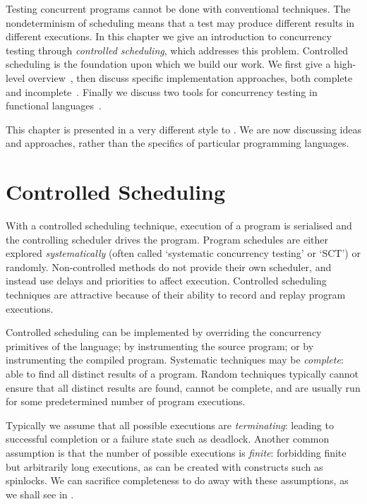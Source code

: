 Testing concurrent programs cannot be done with conventional
techniques.  The nondeterminism of scheduling means that a test may
produce different results in different executions.  In this chapter we
give an introduction to concurrency testing through \emph{controlled
  scheduling}, which addresses this problem.  Controlled scheduling is
the foundation upon which we build our work.  We first give a
high-level overview~, then discuss specific
implementation approaches, both complete~ and
incomplete~.  Finally we discuss two tools for
concurrency testing in functional languages~.

This chapter is presented in a very different style to
.  We are now discussing ideas and
approaches, rather than the specifics of particular programming
languages.

\section{Controlled Scheduling}
\label{sec:sct-fundamentals}

With a controlled scheduling technique, execution of a program is
serialised and the controlling scheduler drives the program.  Program
schedules are either explored
\emph{systematically}\cite{coons2013,flanagan2005,musuvathi2008,musuvathi2007}
(often called `systematic concurrency testing' or `SCT') or
randomly\cite{burckhardt2010,thomson2016}.  Non-controlled methods do
not provide their own scheduler, and instead use delays and priorities
to affect execution\cite{yu2012}.  Controlled scheduling techniques
are attractive because of their ability to record and replay program
executions.

Controlled scheduling can be implemented by overriding the concurrency
primitives of the language\cite{walker2015}; by instrumenting the
source program\cite{claessen2009}; or by instrumenting the compiled
program\cite{musuvathi2006,yu2012}.  Systematic techniques may be
\emph{complete}: able to find all distinct results of a program.
Random techniques typically cannot ensure that all distinct results
are found, cannot be complete, and are usually run for some
predetermined number of program executions.

Typically we assume that all possible executions are
\emph{terminating}: leading to successful completion or a failure
state such as deadlock.  Another common assumption is that the number
of possible executions is \emph{finite}: forbidding finite but
arbitrarily long executions, as can be created with constructs such as
spinlocks\cite{siberschatz1993}.  We can sacrifice completeness to do
away with these assumptions, as we shall see in
.


